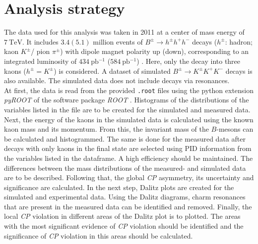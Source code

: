 \section{Analysis strategy}
\label{sec:Analysis_strategy}
The data used for this analysis was taken in 2011 at a center of mass energy of $\qty{7}{\tera\eV}$. It includes $\num{3.4}(\num{5.1})$ million events of 
$B^{\pm} \to h^{\pm} h^+ h^-$ decays ($h^{\pm}$: hadron; kaon $K^{\pm}$/ pion {$\pi^{\pm}$}) with dipole magnet polarity up (down), 
corresponding to an integrated luminosity of $\qty{434}{\pico\barn^{-1}}$ ($\qty{584}{\pico\barn^{-1}}$) \cite{LHCb_CPV}. 
Here, only the decay into three kaons ($h^{\pm} =  K^{\pm}$) is considered.
A dataset of simulated $B^{\pm} \to K^{\pm} K^+ K^-$ decays is also available. The simulated data does not include decays via resonances.\\
At first, the data is read from the provided \texttt{.root} files using the python extension \textit{pyROOT} of the software package \textit{ROOT} \cite{ROOT}.
Histograms of the distributions of the variables listed in the file are to be created for the simulated and measured data.
Next, the energy of the kaons in the simulated data is calculated using the known kaon mass and its momentum. From this, the invariant mass of the $B$-mesons can be calculated 
and histogrammed. 
The same is done for the measured data after decays with only kaons in the final state are selected using PID information from the variables listed in the dataframe. 
A high efficiency should be maintained. The differences between the mass distributions of the measured- and simulated data are to be described.
Following that, the global \textit{CP} asymmetry, its uncertainty and significance are calculated.
In the next step, Dalitz plots are created for the simulated and experimental data. Using the Dalitz diagrams, charm resonances that are present in the measured data can be 
identified and removed. Finally, the local \textit{CP} violation in different areas of the Dalitz plot is to plotted. The areas with the most significant evidence of \textit{CP} violation 
should be identified and the significance of \textit{CP} violation in this areas should be calculated. 
